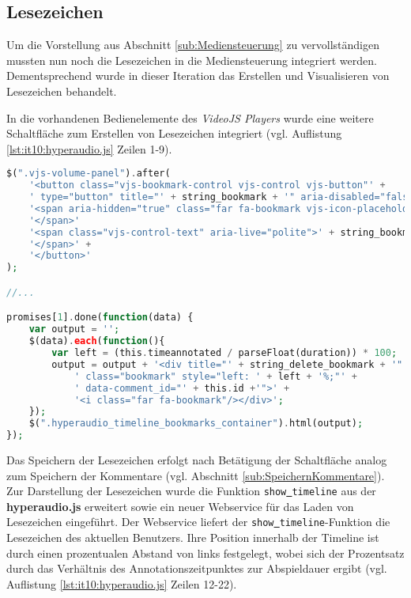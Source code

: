 \subsection{Lesezeichen}
Um die Vorstellung aus Abschnitt \ref{sub:Mediensteuerung} zu vervollständigen mussten nun noch die Lesezeichen in die Mediensteuerung integriert werden. Dementsprechend wurde in dieser Iteration das Erstellen und Visualisieren von Lesezeichen behandelt.

In die vorhandenen Bedienelemente des \textit{VideoJS Players} wurde eine weitere Schaltfläche zum Erstellen von Lesezeichen integriert (vgl. Auflistung \ref{lst:it10:hyperaudio.js} Zeilen 1-9).

\begin{lstlisting}[language=php,
             linewidth=\textwidth,
             caption={Ausschnitt der \textbf{hyperaudio.js} in der 10. Iteration},
             label={lst:it10:hyperaudio.js}]
$(".vjs-volume-panel").after(
    '<button class="vjs-bookmark-control vjs-control vjs-button"' +
    ' type="button" title="' + string_bookmark + '" aria-disabled="false">' +
    '<span aria-hidden="true" class="far fa-bookmark vjs-icon-placeholder">' + 
    '</span>'
    '<span class="vjs-control-text" aria-live="polite">' + string_bookmark +
    '</span>' +
    '</button>'
);

//...

promises[1].done(function(data) {
    var output = '';
    $(data).each(function(){
        var left = (this.timeannotated / parseFloat(duration)) * 100;
        output = output + '<div title="' + string_delete_bookmark + '" ' +
            ' class="bookmark" style="left: ' + left + '%;"' +
            ' data-comment_id="' + this.id +'">' +
            '<i class="far fa-bookmark"/></div>';
    });
    $(".hyperaudio_timeline_bookmarks_container").html(output);
});
\end{lstlisting}

Das Speichern der Lesezeichen erfolgt nach Betätigung der Schaltfläche analog zum Speichern der Kommentare (vgl. Abschnitt \ref{sub:SpeichernKommentare}). Zur Darstellung der Lesezeichen wurde die Funktion \texttt{show\underline{{ }}timeline} aus der \textbf{hyperaudio.js} erweitert sowie ein neuer Webservice für das Laden von Lesezeichen eingeführt. Der Webservice liefert der \texttt{show\underline{{ }}timeline}-Funktion die Lesezeichen des aktuellen Benutzers. Ihre Position innerhalb der Timeline ist durch einen prozentualen Abstand von links festgelegt, wobei sich der Prozentsatz durch das Verhältnis des Annotationszeitpunktes zur Abspieldauer ergibt (vgl. Auflistung \ref{lst:it10:hyperaudio.js} Zeilen 12-22).

